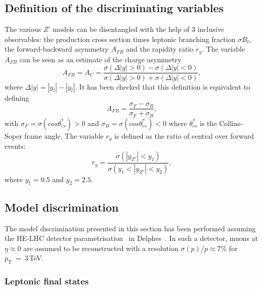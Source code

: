 \documentclass[a4paper,11pt]{article}
\newcommand{\pt}{\ensuremath{p_{\text{T}}}}
\newcommand{\delphes}{{\sc Delphes}}
\begin{document}
\subsection{Definition of the discriminating variables}
\label{par:vardef}

The various $Z'$ models can be disentangled with the help of 3 inclusive observables: the production cross section times leptonic branching fraction $\sigma B_l$, the forward-backward asymmetry $A_{FB}$ and the rapidity ratio $r_y$. The variable $A_{FB}$ can be seen as an estimate of the charge asymmetry
\begin{equation}
A_{FB} = A_C =  \frac{\sigma(\Delta|y| > 0) - \sigma(\Delta|y| < 0)}{\sigma(\Delta|y| > 0) + \sigma(\Delta|y| < 0)},
\end{equation}
where $\Delta|y| = |y_l| - |y_{\bar{l}}|$. It has been checked that this definition is equivalent to defining
\begin{equation}
A_{FB} = \frac{\sigma_F - \sigma_B}{\sigma_F + \sigma_B},
\end{equation}
with $\sigma_F = \sigma (cos\theta^{*}_{cs})>0$ and $\sigma_B = \sigma (cos\theta^{*}_{cs})<0$ where $\theta^*_{cs}$ is the Collins-Soper frame angle. The variable $r_y$ is defined as the ratio of central over forward events:
\begin{equation}
r_y = \frac{\sigma(|y_{Z'}| < y_1)}{\sigma(y_1 < |y_{Z'}| <y_2)},
\end{equation}
where $y_1=0.5$ and $y_2=2.5$.

\subsection{Model discrimination}

The model discrimination presented in this section has been performed assuming the HE-LHC detector parametrisation~\cite{hlhelhc_web} in \delphes~\cite{deFavereau:2013fsa}. In such a detector, muons at $\eta \approx 0$ are assumed to be reconstructed with a resolution $\sigma(p)/p \approx 7\%$ for $\pt~=~3$\,TeV.

\subsubsection{Leptonic final states}
\label{par:lepana}
\end{document}
